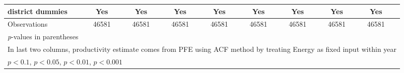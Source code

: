 \begin{table}[htbp]
\begin{tabular}{l*{8}{cc}}
district dummies    &         Yes         &            &         Yes         &            &         Yes         &            &         Yes         &            &         Yes         &            &         Yes         &            &         Yes         &            &         Yes         &            \\
\midrule
Observations        &       46581         &            &       46581         &            &       46581         &            &       46581         &            &       46581         &            &       46581         &            &       46581         &            &       46581         &            \\
\bottomrule
\multicolumn{17}{l}{\footnotesize \textit{p}-values in parentheses}\\
\multicolumn{17}{l}{\footnotesize In last two columns, productivity estimate comes from PFE using ACF method by treating Energy as fixed input within year}\\
\multicolumn{17}{l}{\footnotesize \sym{+} \(p<0.1\), \sym{*} \(p<0.05\), \sym{**} \(p<0.01\), \sym{***} \(p<0.001\)}\\
\end{tabular}
\end{table}
